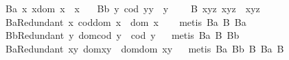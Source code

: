 \begin{isabellebody}
\ B{}a{\isacharcolon}\ {\isachardoublequoteopen}\isactrlbold {\isasymforall}x{\isachardot}\ x{\isasymcdot}{\isacharparenleft}dom\ x{\isacharparenright}\ {\isasymcong}\ x{\isachardoublequoteclose}\ \ \isanewline
\ B{}b{\isacharcolon}\ {\isachardoublequoteopen}\isactrlbold {\isasymforall}y{\isachardot}\ {\isacharparenleft}cod\ y{\isacharparenright}{\isasymcdot}y\ {\isasymcong}\ y{\isachardoublequoteclose}\ \ \isanewline
\ \ B{}{\isacharcolon}\ {\isachardoublequoteopen}\isactrlbold {\isasymforall}x{\isachardot}\isactrlbold {\isasymforall}y{\isachardot}\isactrlbold {\isasymforall}z{\isachardot}\ x{\isasymcdot}{\isacharparenleft}y{\isasymcdot}z{\isacharparenright}\ {\isasymcong}\ {\isacharparenleft}x{\isasymcdot}y{\isacharparenright}{\isasymcdot}z{\isachardoublequoteclose}\ \ \isanewline
\isanewline
\ \ \isamarkupfalse%
\ B{}aRedundant{\isacharcolon}\ {\isachardoublequoteopen}\isactrlbold {\isasymforall}x{\isachardot}\ cod{\isacharparenleft}dom\ x{\isacharparenright}\ {\isasymcong}\ dom\ x\ {\isachardoublequoteclose}%
\isadelimproof
\ %
\endisadelimproof
%
\isatagproof
{}\isamarkupfalse%
\ {\isacharparenleft}metis\ B{}a\ B{}\ B{}a{\isacharparenright}%
\endisatagproof
{\isafoldproof}%
%
\isadelimproof
%
\endisadelimproof
\ \isanewline
\ \ \isamarkupfalse%
\ B{}bRedundant{\isacharcolon}\ {\isachardoublequoteopen}\isactrlbold {\isasymforall}y{\isachardot}\ dom{\isacharparenleft}cod\ y{\isacharparenright}\ {\isasymcong}\ cod\ y{\isachardoublequoteclose}%
\isadelimproof
\ %
\endisadelimproof
%
\isatagproof
{}\isamarkupfalse%
\ {\isacharparenleft}metis\ B{}a\ B{}\ B{}b{\isacharparenright}%
\endisatagproof
{\isafoldproof}%
%
\isadelimproof
%
\endisadelimproof
\ \isanewline
\ \ \isamarkupfalse%
\ B{}aRedundant{\isacharcolon}\ {\isachardoublequoteopen}\isactrlbold {\isasymforall}x{\isachardot}\isactrlbold {\isasymforall}y{\isachardot}\ dom{\isacharparenleft}x{\isasymcdot}y{\isacharparenright}\ {\isasymcong}\ dom{\isacharparenleft}{\isacharparenleft}dom\ x{\isacharparenright}{\isasymcdot}y{\isacharparenright}{\isachardoublequoteclose}%
\isadelimproof
\ %
\endisadelimproof
%
\isatagproof
{}\isamarkupfalse%
\ {\isacharparenleft}metis\ B{}a\ B{}b\ B{}\ B{}a\ B{}{\isacharparenright}%
\endisatagproof
{\isafoldproof}%
%
\isadelimproof
%
\endisadelimproof

\end{isabellebody}
